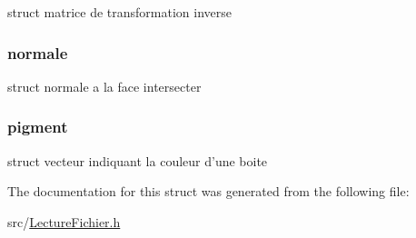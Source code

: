 \label{structbox_acd7a3590501dcccfaefccbb658f83821}
struct matrice de transformation inverse \hypertarget{structbox_a944738f40a0294270a0047acc5a77ee2}{
\subsubsection[{normale}]{ {\bf normale}}}
\label{structbox_a944738f40a0294270a0047acc5a77ee2}
struct normale a la face intersecter \hypertarget{structbox_a5a4ee24431a1811fa1c8b75844198987}{
\subsubsection[{pigment}]{ {\bf pigment}}}
\label{structbox_a5a4ee24431a1811fa1c8b75844198987}
struct vecteur indiquant la couleur d'une boite 

The documentation for this struct was generated from the following file:\begin{DoxyCompactItemize}
\item 
src/\hyperlink{_lecture_fichier_8h}{LectureFichier.h}\end{DoxyCompactItemize}
